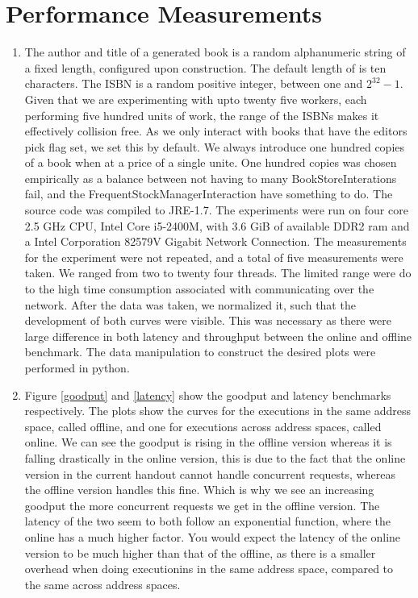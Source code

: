 \documentclass[a4paper]{article}
\begin{document}
\section{Performance Measurements}
\begin{enumerate}
  \item The author and title of a generated book is a random alphanumeric string of a fixed length, configured upon construction. The default length of is ten characters. The ISBN is a random positive integer, between one and \(2^{32}-1\). Given that we are experimenting with upto twenty five workers, each performing five hundred units of work, the range of the ISBNs makes it effectively collision free. As we only interact with books that have the editors pick flag set, we set this by default. We always introduce one hundred copies of a book when at a price of a single unite. One hundred copies was chosen empirically as a balance between not having to many BookStoreInterations fail, and the FrequentStockManagerInteraction have something to do. The source code was compiled to JRE-1.7. The experiments were run on four core 2.5 GHz CPU, Intel Core i5-2400M, with 3.6 GiB of available DDR2 ram and a Intel Corporation 82579V Gigabit Network Connection. The measurements for the experiment were not repeated, and a total of five measurements were taken. We ranged from two to twenty four threads. The limited range were do to the high time consumption associated with communicating over the network. After the data was taken, we normalized it, such that the development of both curves were visible. This was necessary as there were large difference in both latency and throughput between the online and offline benchmark. The data manipulation to construct the desired plots were performed in python.
  \item Figure \ref{goodput} and \ref{latency} show the goodput and latency benchmarks respectively. The plots show the curves for the executions in the same address space, called offline, and one for executions across address spaces, called online. We can see the goodput is rising in the offline version whereas it is falling drastically in the online version, this is due to the fact that the online version in the current handout cannot handle concurrent requests, whereas the offline version handles this fine. Which is why we see an increasing goodput the more concurrent requests we get in the offline version. The latency of the two seem to both follow an exponential function, where the online has a much higher factor. You would expect the latency of the online version to be much higher than that of the offline, as there is a smaller overhead when doing executionins in the same address space, compared to the same across address spaces.

\end{enumerate}
\end{document}
